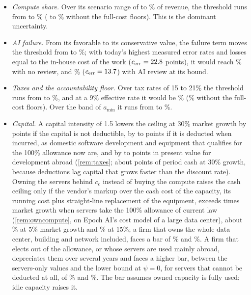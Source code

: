 \begin{itemize}
\item \emph{Compute share.} Over its scenario range of \CcLo{} to \CcHi\% of revenue, the threshold runs from \GstarCcLo{} to \GstarCcHi\% (\GstarAccCcLo{} to \GstarAccCcHi\% without the full-cost floors). This is the dominant uncertainty.
\item \emph{AI failure.} From its favorable to its conservative value, the failure term moves the threshold from \GstarCerrFav{} to \GstarCerrCons\%; with today's highest measured error rates and losses equal to the in-house cost of the work ($c_{\mathrm{err}}=22.8$ points), it would reach \GstarCerrHigh\% with no review, and \GstarCerrHighAi\% ($c_{\mathrm{err}}=13.7$) with AI review at its bound.
\item \emph{Taxes and the accountability floor.} Over tax rates of 15 to 21\% the threshold runs from \GstarTauLo{} to \GstarTauHi\%, and at a 9\% effective rate it would be \GstarTauLow\% (\GstarAccTauLow\% without the full-cost floors). Over the band of $a_{\min}$ it runs from \GstarAminLo{} to \GstarAminHi\%.
\item \emph{Capital.} A capital intensity of 1.5 lowers the ceiling at 30\% market growth by \KcapLossNone{} points if the capital is not deductible, by \KcapLossDomLo{} to \KcapLossDomHi{} points if it is deducted when incurred, as domestic software development and equipment that qualifies for the 100\% allowance now are, and by \KcapLossForLo{} to \KcapLossForHi{} points in present value for development abroad (\autoref{rem:taxes}; about \KcapLossForCash{} points of period cash at 30\% growth, because deductions lag capital that grows faster than the discount rate). Owning the servers behind $c_c$ instead of buying the compute raises the cash ceiling only if the vendor's markup over the cash cost of the capacity, its running cost plus straight-line replacement of the equipment, exceeds \OwnKapSrv{} times market growth when servers take the 100\% allowance of current law (\autoref{rem:owncompute}, on Epoch AI's cost model of a large data center), about \OwnMarkupFive\% at 5\% market growth and \OwnMarkupFifteen\% at 15\%; a firm that owns the whole data center, building and network included, faces a bar of \OwnMarkupFiveAll\% and \OwnMarkupFifteenAll\%. A firm that elects out of the allowance, or whose servers are used mainly abroad, depreciates them over several years and faces a higher bar, between the servers-only values and the lower bound at $\psi=0$, for servers that cannot be deducted at all, of \OwnMarkupFiveNone\% and \OwnMarkupFifteenNone\%. The bar assumes owned capacity is fully used; idle capacity raises it.

\end{itemize}
